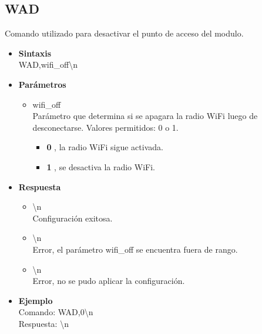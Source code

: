 \documentclass[a4paper,spanish]{article}
\begin{document}
\subsection{WAD}
Comando utilizado para desactivar el punto de acceso del modulo. 
\begin{itemize}
	\item \textbf{Sintaxis}\\
	{\ttfamily WAD,wifi\_off\textbackslash n}
	\item \textbf{Parámetros}
	\begin{itemize}
		\item{\ttfamily wifi\_off}\\
		Parámetro que determina si se apagara la radio WiFi luego de desconectarse. Valores permitidos: 0 o 1.
		\begin{itemize}
			\item \textbf{0} , la radio WiFi sigue activada. 
			\item \textbf{1} , se desactiva la radio WiFi.
		\end{itemize}
	\end{itemize}
	\item \textbf{Respuesta}
	\begin{itemize}
		\item{\textbackslash n} \\
		Configuración exitosa.
		\item{\textbackslash n} \\
		Error, el parámetro {\ttfamily  wifi\_off} se encuentra fuera de rango.
		\item{\textbackslash n} \\
		Error, no se pudo aplicar la configuración.
	\end{itemize}
	\item \textbf{Ejemplo}\\
	Comando: {\ttfamily WAD,0\textbackslash n}\\
	Respuesta: {\textbackslash n}
\end{itemize}
\end{document}
